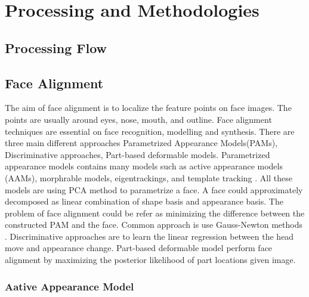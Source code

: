 \chapter{Processing and Methodologies}

\section{Processing Flow}

\section{Face Alignment}
The aim of face alignment is to localize the feature points on face images. The points are usually around eyes, nose, mouth, and outline. Face alignment techniques are essential on face recognition, modelling and synthesis. There are three main different approaches Parametrized Appearance Models(PAMs), Discriminative approaches, Part-based deformable models. Parametrized appearance models contains many models such as active appearance models (AAMs), morphrable models, eigentrackings, and template tracking \cite{xiong2013supervised}. All these models are using PCA method to parametrize a face. A face could approximately decomposed as linear combination of shape basis and appearance basis. The problem of face alignment could be refer as minimizing the difference between the constructed PAM and the face. Common approach is use Gauss-Newton methods \cite{xiong2013supervised}. Discriminative approaches are to learn the linear regression between the head move and appearance change. Part-based deformable model perform face alignment by maximizing the posterior likelihood of part locations given image\cite{xiong2013supervised}. 

\subsection{Aative Appearance Model}

